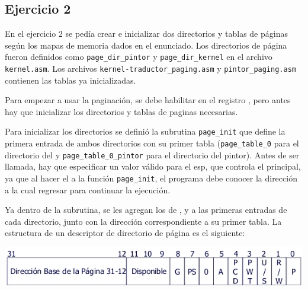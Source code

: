 \subsection{Ejercicio 2}
	En el ejercicio 2 se pedía crear e inicializar dos directorios y tablas de páginas según los mapas de memoria dados en el enunciado. Los 
directorios de página fueron definidos como \verb=page_dir_pintor= y \verb=page_dir_kernel= en el archivo \verb=kernel.asm=. Los archivos 
\verb=kernel-traductor_paging.asm= y \verb=pintor_paging.asm= contienen las tablas ya inicializadas. 

	Para empezar a usar la paginación, se debe habilitar en el registro , pero antes hay que inicializar los directorios y tablas de paginas 
necesarias. 

	Para inicializar los directorios se definió la subrutina \verb=page_init= que define la primera entrada de ambos directorios con su primer tabla 
(\verb=page_table_0= para el directorio del  y \verb=page_table_0_pintor= para el directorio del pintor). Antes de ser llamada, hay que 
especificar un valor válido para el esp, que controla el  principal, ya que al hacer el  a la función \verb=page_init=, el 
programa debe conocer la dirección a la cual regresar para continuar la ejecución. 

Ya dentro de la subrutina, se les agregan los  de ,  y  a las primeras entradas de cada 
directorio, junto con la dirección correspondiente a su primer tabla. 
La estructura de un descriptor de directorio de página es el siguiente:

\begin{center}
\includegraphics[scale=0.5]{descriptorpagina.jpg}
\end{center}


